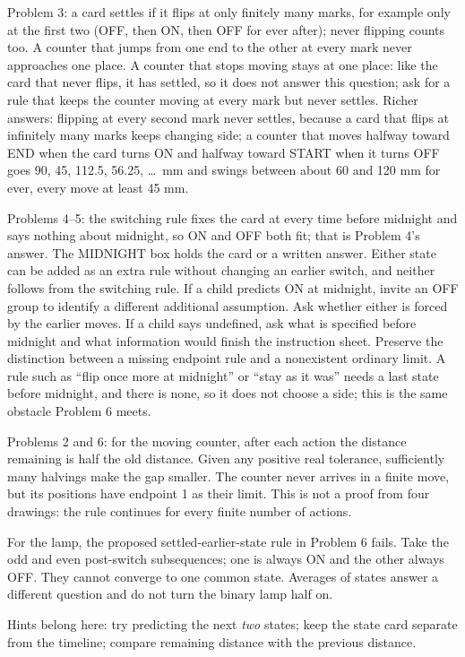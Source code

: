 \documentclass[11pt,letterpaper]{article}
\begin{document}
Problem 3: a card settles if it flips at only finitely many marks, for example only at the first two (OFF, then ON, then OFF for ever after); never flipping counts too. A counter that jumps from one end to the other at every mark never approaches one place. A counter that stops moving stays at one place: like the card that never flips, it has settled, so it does not answer this question; ask for a rule that keeps the counter moving at every mark but never settles. Richer answers: flipping at every second mark never settles, because a card that flips at infinitely many marks keeps changing side; a counter that moves halfway toward END when the card turns ON and halfway toward START when it turns OFF goes 90, 45, 112.5, 56.25, \ldots\ mm and swings between about 60 and 120 mm for ever, every move at least 45 mm.

Problems 4--5: the switching rule fixes the card at every time before midnight and says nothing about midnight, so ON and OFF both fit; that is Problem 4's answer. The MIDNIGHT box holds the card or a written answer. Either state can be added as an extra rule without changing an earlier switch, and neither follows from the switching rule. If a child predicts ON at midnight, invite an OFF group to identify a different additional assumption. Ask whether either is forced by the earlier moves. If a child says undefined, ask what is specified before midnight and what information would finish the instruction sheet. Preserve the distinction between a missing endpoint rule and a nonexistent ordinary limit. A rule such as ``flip once more at midnight'' or ``stay as it was'' needs a last state before midnight, and there is none, so it does not choose a side; this is the same obstacle Problem 6 meets.

Problems 2 and 6: for the moving counter, after each action the distance remaining is half the old distance. Given any positive real tolerance, sufficiently many halvings make the gap smaller. The counter never arrives in a finite move, but its positions have endpoint 1 as their limit. This is not a proof from four drawings: the rule continues for every finite number of actions.

For the lamp, the proposed settled-earlier-state rule in Problem 6 fails. Take the odd and even post-switch subsequences; one is always ON and the other always OFF. They cannot converge to one common state. Averages of states answer a different question and do not turn the binary lamp half on.

Hints belong here: try predicting the next \emph{two} states; keep the state card separate from the timeline; compare remaining distance with the previous distance.
\newpage
\end{document}

